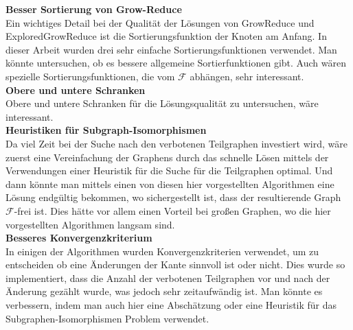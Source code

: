 \documentclass[12pt,a4paper,onecolumn,oneside,titlepage]{article}
\newcommand\cursive[1]{\ensuremath{\mathcal{#1}}}
\begin{document}
\textbf{Besser Sortierung von Grow-Reduce}\\
Ein wichtiges Detail bei der Qualität der Lösungen von GrowReduce und ExploredGrowReduce ist die Sortierungsfunktion der Knoten am Anfang. In dieser Arbeit wurden drei sehr einfache Sortierungsfunktionen verwendet. Man könnte untersuchen, ob es bessere allgemeine Sortierfunktionen gibt. Auch wären spezielle Sortierungsfunktionen, die vom \cursive{F} abhängen, sehr interessant.\\


\textbf{Obere und untere Schranken}\\
Obere und untere Schranken für die Lösungsqualität zu untersuchen, wäre interessant.\\

\textbf{Heuristiken für Subgraph-Isomorphismen}\\
Da viel Zeit bei der Suche nach den verbotenen Teilgraphen investiert wird, wäre zuerst eine Vereinfachung der Graphens durch das schnelle Lösen mittels der Verwendungen einer Heuristik für die Suche für die Teilgraphen \cite{Dehmer13} optimal. Und dann könnte man mittels einen von diesen hier vorgestellten Algorithmen eine Lösung endgültig bekommen, wo sichergestellt ist, dass der resultierende Graph \cursive{F}-frei ist. Dies hätte vor allem einen Vorteil bei großen Graphen, wo die hier vorgestellten Algorithmen langsam sind.\\

\textbf{Besseres Konvergenzkriterium}\\
In einigen der Algorithmen wurden Konvergenzkriterien verwendet, um zu entscheiden ob eine Änderungen der Kante sinnvoll ist oder nicht. Dies wurde so implementiert, dass die Anzahl der verbotenen Teilgraphen vor und nach der Änderung gezählt wurde, was jedoch sehr zeitaufwändig ist. Man könnte es verbessern, indem man auch hier eine Abschätzung oder eine Heuristik für das Subgraphen-Isomorphismen Problem verwendet.


\newpage


\end{document}
